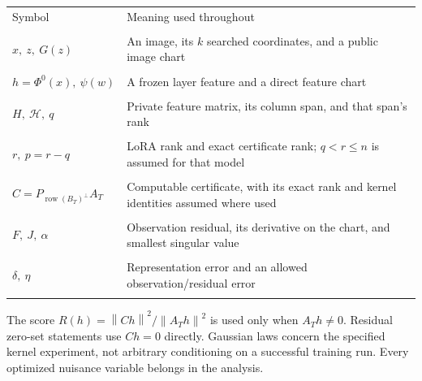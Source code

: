 \documentclass[11pt,a4paper]{article}
\theoremstyle{definition}
\theoremstyle{definition}
\theoremstyle{remark}\newtheorem{remark}[theorem]{Remark}
\newcommand{\HH}{\mathcal H}\newcommand{\XX}{\mathcal X}\newcommand{\col}{\operatorname{col}}
\newcommand{\row}{\operatorname{row}}\newcommand{\rank}{\operatorname{rank}}
\newcommand{\norm}[1]{\left\lVert #1\right\rVert}
\begin{document}
\begin{center}
\small
\begin{tabular}{@{}Y{.25\textwidth}Y{.65\textwidth}@{}}
\toprule
Symbol & Meaning used throughout\\\\
\midrule
$x,\ z,\ G(z)$ & An image, its $k$ searched coordinates, and a public image chart\\\\
$h=\Phi^0(x),\ \psi(w)$ & A frozen layer feature and a direct feature chart\\\\
$H,\ \HH,\ q$ & Private feature matrix, its column span, and that span's rank\\\\
$r,\ p=r-q$ & LoRA rank and exact certificate rank; $q<r\le n$ is assumed for that model\\\\
$C=P_{\row(B_T)^\perp}A_T$ & Computable certificate, with its exact rank and kernel identities assumed where used\\\\
$F,\ J,\ \alpha$ & Observation residual, its derivative on the chart, and smallest singular value\\\\
$\delta,\ \eta$ & Representation error and an allowed observation/residual error\\\\
\bottomrule
\end{tabular}
\end{center}

The score $R(h)=\norm{Ch}^2/\norm{A_Th}^2$ is used only when $A_Th\ne0$. Residual zero-set statements use $Ch=0$ directly. Gaussian laws concern the specified kernel experiment, not arbitrary conditioning on a successful training run. Every optimized nuisance variable belongs in the analysis.
\end{document}
